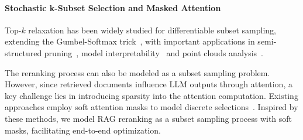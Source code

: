 



\paragraph{Stochastic k-Subset Selection and Masked Attention}
Top-$k$ relaxation has been widely studied for differentiable subset sampling, extending the Gumbel-Softmax trick~\cite{DBLP:conf/iclr/JangGP17, DBLP:conf/ijcai/XieE19, DBLP:conf/nips/XieDCDZZ0P20}, with important applications in  semi-structured pruning~\cite{DBLP:conf/nips/FangYMHPK0W24}, model interpretability~\cite{DBLP:conf/icml/ChenSWJ18} and point clouds analysis~\cite{DBLP:conf/cvpr/YangZNLLZT19}.

The reranking process can also be modeled as a subset sampling problem. However, since retrieved documents influence LLM outputs through attention, a key challenge lies in introducing sparsity into the attention computation. Existing approaches employ soft attention masks to model discrete selections~\cite{DBLP:conf/naacl/FanGLWWJDZH21, DBLP:conf/cvpr/YangZNLLZT19}. Inspired by these methods, we model RAG reranking as a subset sampling process with soft masks, facilitating end-to-end optimization.



